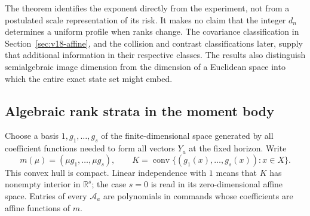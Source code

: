 \documentclass[11pt]{amsart}
\theoremstyle{definition}\newtheorem{definition}[theorem]{Definition}
\theoremstyle{remark}\newtheorem{remark}[theorem]{Remark}
\newcommand{\R}{\mathbb R}\newcommand{\N}{\mathbb N}\newcommand{\C}{\mathbb C}
\begin{document}
The theorem identifies the exponent directly from the experiment, not
from a postulated scale representation of its risk. It makes no claim
that the integer $d_n$ determines a uniform profile when ranks change.
The covariance classification in Section~\ref{sec:v18-affine}, and the
collision and contrast classifications later, supply that additional
information in their respective classes. The results also distinguish
semialgebraic image dimension from the dimension of a Euclidean space
into which the entire exact state set might embed.

\subsection{Algebraic rank strata in the moment body}
Choose a basis $1,g_1,\ldots,g_s$ of the finite-dimensional space
generated by all coefficient functions needed to form all vectors
$Y_a$ at the fixed horizon. Write
\[
 m(\mu)=(\mu g_1,\ldots,\mu g_s),\qquad
 K=\operatorname{conv}\{(g_1(x),\ldots,g_s(x)):x\in X\}.
\]
This convex hull is compact. Linear independence with $1$ means that
$K$ has nonempty interior in $\R^s$; the case $s=0$ is read in its
zero-dimensional affine space. Entries of every $\mathcal A_a$ are
polynomials in commands whose coefficients are affine functions of $m$.
\end{document}
